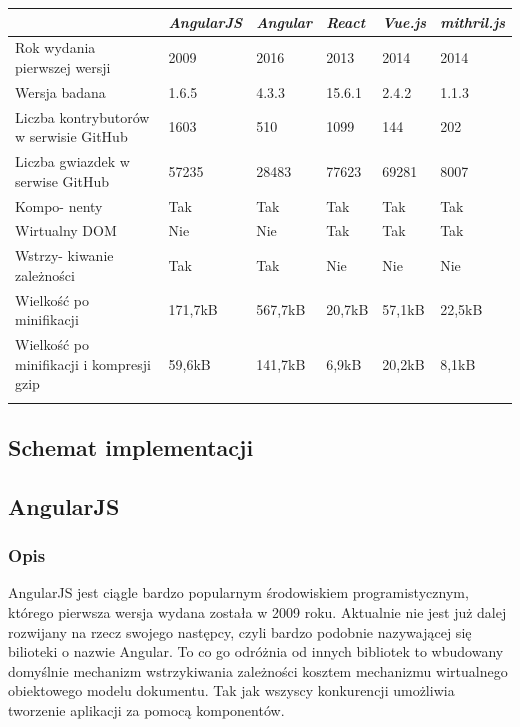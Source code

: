 \documentclass[polish, twoside, 12pt]{mwart}
\begin{document}
\begin{center}
  \begin{tabularx}{\textwidth}{|X|X|X|X|X|X|}\hline
    & \emph{AngularJS} & \emph{Angular} & \emph{React} & \emph{Vue.js} & \emph{mithril.js}\\ \hline
    Rok wydania pierwszej wersji & 2009 & 2016 & 2013 & 2014 & 2014 \\ \hline
    Wersja badana & 1.6.5 & 4.3.3 & 15.6.1 & 2.4.2 & 1.1.3 \\ \hline
    Liczba kontrybutorów w serwisie GitHub & 1603 & 510 & 1099 & 144 & 202 \\ \hline
    Liczba gwiazdek w serwise GitHub & 57235 & 28483 & 77623 & 69281 & 8007 \\ \hline
    Kompo- nenty & Tak & Tak & Tak & Tak & Tak \\ \hline
    Wirtualny DOM & Nie & Nie & Tak & Tak & Tak \\ \hline
    Wstrzy- kiwanie zależności & Tak & Tak & Nie & Nie & Nie \\ \hline
    Wielkość po minifikacji & 171,7kB & 567,7kB & 20,7kB & 57,1kB & 22,5kB \\ \hline
    Wielkość po minifikacji i kompresji gzip & 59,6kB & 141,7kB & 6,9kB & 20,2kB & 8,1kB \\ \hline
    \caption{Porównanie bibliotek}
  \end{tabularx}
\end{center}

\subsection{Schemat implementacji}

\subsection{AngularJS}

\subsubsection{Opis}

AngularJS jest ciągle bardzo popularnym środowiskiem programistycznym, którego pierwsza wersja wydana została w 2009 roku. Aktualnie nie jest już dalej rozwijany na rzecz swojego następcy, czyli bardzo podobnie nazywającej się bilioteki o nazwie Angular. To co go odróżnia od innych bibliotek to wbudowany domyślnie mechanizm wstrzykiwania zależności kosztem mechanizmu wirtualnego obiektowego modelu dokumentu. Tak jak wszyscy konkurencji umożliwia tworzenie aplikacji za pomocą komponentów.
\end{document}
